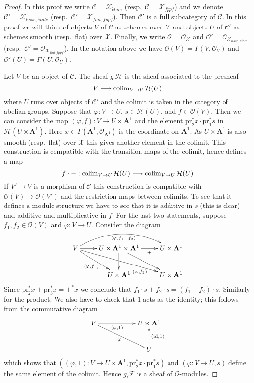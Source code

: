 \begin{proof}
In this proof we write
$\mathcal{C} = \mathcal{X}_{\acute{e}tale}$
(resp.\ $\mathcal{C} = \mathcal{X}_{fppf}$)
and we denote
$\mathcal{C}' = \mathcal{X}_{lisse,\acute{e}tale}$
(resp.\ $\mathcal{C}' = \mathcal{X}_{flat, fppf}$).
Then $\mathcal{C}'$ is a full subcategory of $\mathcal{C}$.
In this proof we will think of objects $V$ of $\mathcal{C}$
as schemes over $\mathcal{X}$ and objects $U$ of $\mathcal{C}'$
as schemes smooth (resp.\ flat) over $\mathcal{X}$.
Finally, we write $\mathcal{O} = \mathcal{O}_\mathcal{X}$
and $\mathcal{O}' = \mathcal{O}_{\mathcal{X}_{lisse,\acute{e}tale}}$
(resp.\ $\mathcal{O}' = \mathcal{O}_{\mathcal{X}_{flat,fppf}}$).
In the notation above we have $\mathcal{O}(V) = \Gamma(V, \mathcal{O}_V)$
and $\mathcal{O}'(U) = \Gamma(U, \mathcal{O}_U)$.

\medskip\noindent
Let $V$ be an object of $\mathcal{C}$. The sheaf $g_!\mathcal{H}$ is
the sheaf associated to the presheaf
$$
V \longmapsto \mathop{\rm colim}\nolimits_{V \to U} \mathcal{H}(U)
$$
where $U$ runs over objects of $\mathcal{C}'$ and the colimit is taken
in the category of abelian groups. Suppose that
$\varphi : V \to U$, $s \in \mathcal{H}(U)$, and $f \in \mathcal{O}(V)$.
Then we can consider the map $(\varphi, f) : V \to U \times \mathbf{A}^1$
and the element $\text{pr}_2^*x \cdot \text{pr}_1^*s$ in
$\mathcal{H}(U \times \mathbf{A}^1)$. Here
$x \in \Gamma(\mathbf{A}^1, \mathcal{O}_{\mathbf{A}^1})$ is the coordinate on
$\mathbf{A}^1$. As $U \times \mathbf{A}^1$ is also smooth (resp.\ flat)
over $\mathcal{X}$ this gives another element in the
colimit. This construction is compatible with the transition maps of the
colimit, hence defines a map
$$
f \cdot - : \mathop{\rm colim}\nolimits_{V \to U} \mathcal{H}(U)
\longrightarrow
\mathop{\rm colim}\nolimits_{V \to U} \mathcal{H}(U)
$$
If $V' \to V$ is a morphism of $\mathcal{C}$ this construction is compatible
with $\mathcal{O}(V) \to \mathcal{O}(V')$ and the restriction maps between
colimits. To see that it defines a module structure we have to see
that it is additive in $s$ (this is clear) and additive and multiplicative
in $f$. For the last two statements, suppose $f_1, f_2 \in \mathcal{O}(V)$
and $\varphi : V \to U$. Consider the diagram
$$
\xymatrix{
V \ar[r] \ar[rd]_{(\varphi, f_1)} \ar[rrd]_(.7){(\varphi, f_2)}
\ar@/^5ex/[rr]_{(\varphi, f_1 + f_2)} &
U \times \mathbf{A}^1 \times \mathbf{A}^1 \ar[r]_-{+} \ar[d] \ar[dr] &
U \times \mathbf{A}^1 \\
 &
U \times \mathbf{A}^1 &
U \times \mathbf{A}^1
}
$$
Since $\text{pr}_2^*x + \text{pr}_3^*x = {+}^*x$ we conclude that
$f_1 \cdot s + f_2 \cdot s = (f_1 + f_2) \cdot s$. Similarly for the product.
We also have to check that $1$ acts as the identity; this follows from the
commutative diagram
$$
\xymatrix{
V \ar[rr]_-{(\varphi, 1)} \ar[rrd]_\varphi & & U \times \mathbf{A}^1 \\
& & U \ar[u]_{(\text{id}, 1)}
}
$$
which shows that
$((\varphi, 1): V \to U \times \mathbf{A}^1,
\text{pr}_2^*x \cdot \text{pr}_1^*s)$ and $(\varphi : V \to U, s)$
define the same element of the colimit.
Hence $g_!\mathcal{F}$ is a sheaf of $\mathcal{O}$-modules.


\end{proof}
